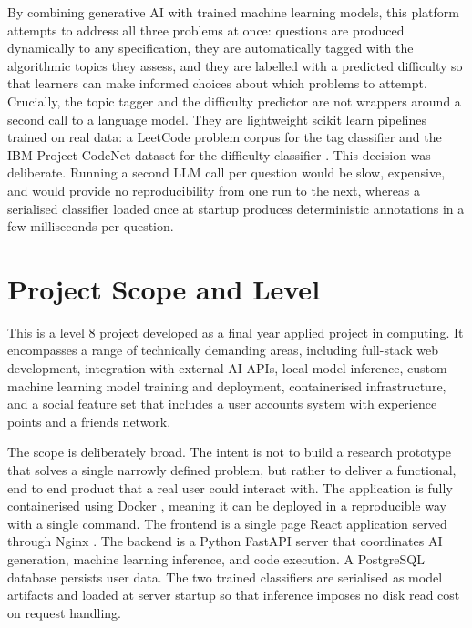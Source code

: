 By combining generative AI with trained machine learning models, this
platform attempts to address all three problems at once: questions are
produced dynamically to any specification, they are automatically tagged
with the algorithmic topics they assess, and they are labelled with a
predicted difficulty so that learners can make informed choices about which problems to attempt. Crucially, the topic tagger and the difficulty predictor are not wrappers around a second call to a language model. They are lightweight scikit learn pipelines \cite{pedregosa2011} trained on real data: a LeetCode problem corpus for the tag classifier \cite{kaggleleetcode2025} and the IBM Project CodeNet dataset for the difficulty classifier \cite{puri2021codenet}. This decision was deliberate. Running a second LLM call per question would
be slow, expensive, and would provide no reproducibility from one run to the next, whereas a serialised classifier loaded once at startup produces
deterministic annotations in a few milliseconds per question.

\section{Project Scope and Level}

This is a level 8 project developed as a final year applied project in
computing. It encompasses a range of technically demanding areas, including full-stack web development, integration with external AI APIs, local model inference, custom machine learning model training and deployment, containerised infrastructure, and a social feature set that includes a user accounts system with experience points and a friends network.

The scope is deliberately broad. The intent is not to build a research
prototype that solves a single narrowly defined problem, but rather to
deliver a functional, end to end product that a real user could interact with. The application is fully containerised using Docker \cite{merkel2014docker}, meaning it can be deployed in a reproducible way with a single command. The frontend is a single page React application \cite{react2013} served through Nginx \cite{nginx2025}. The backend is a Python FastAPI server \cite{fastapi2025} that coordinates AI generation, machine learning inference, and code execution. A PostgreSQL database \cite{postgres2025} persists user data. The two trained classifiers are serialised as model artifacts and loaded at server startup so that inference imposes no disk read cost on
request handling.

